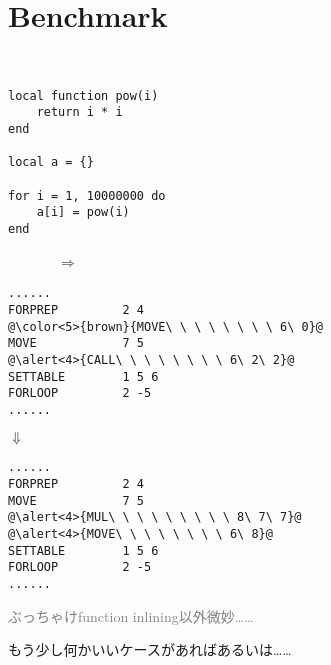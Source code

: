 \section{Benchmark}
\begin{frame}[fragile]
\frametitlesec
\begin{minipage}{.05\textwidth}
	\ 
\end{minipage}
\begin{minipage}[t]{.3\textwidth}
	\scriptsize
	\begin{lstlisting}[language={[5.3]lua},numbers=none]
local function pow(i)
	return i * i
end

local a = {}

for i = 1, 10000000 do
	a[i] = pow(i)
end
	\end{lstlisting}
	\begin{minipage}[t]{1.2\textwidth}
			\vspace{3\zw}
	\end{minipage}
\end{minipage}
\begin{minipage}[t]{.2\textwidth}
	\pause
	\vspace{3\zw}
	\ \ \ \ \ \ \ $\Rightarrow$

	\vspace{6\zw}
\end{minipage}
\begin{minipage}[t]{.3\textwidth}
	\bgroup
	\scriptsize
	\begin{lstlisting}[style=snippet,escapechar={@}]
......
FORPREP         2 4
@\color<5>{brown}{MOVE\ \ \ \ \ \ \ \ 6\ 0}@
MOVE            7 5
@\alert<4>{CALL\ \ \ \ \ \ \ \ 6\ 2\ 2}@
SETTABLE        1 5 6
FORLOOP         2 -5   
......
	\end{lstlisting}
	\egroup

	\pause
	\vspace{-1\zw}
	\begin{center}
		$\Downarrow$
	\end{center}
	\vspace{-1\zw}
	\scriptsize
	\begin{lstlisting}[style=snippet,escapechar={@}]
......
FORPREP         2 4    
MOVE            7 5
@\alert<4>{MUL\ \ \ \ \ \ \ \ \ 8\ 7\ 7}@
@\alert<4>{MOVE\ \ \ \ \ \ \ \ 6\ 8}@
SETTABLE        1 5 6
FORLOOP         2 -5   
......
	\end{lstlisting}
\end{minipage}
\end{frame}
\begin{frame}{}

	\begin{flushright}
		{\footnotesize\textcolor{gray}{ぶっちゃけfunction inlining以外微妙……}}
	\end{flushright}

	\vspace{4\zw}
もう少し何かいいケースがあればあるいは……

\end{frame}
